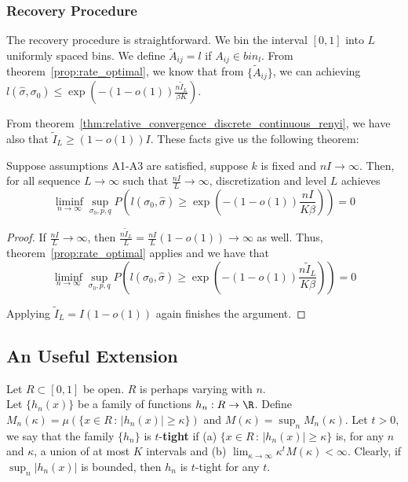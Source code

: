\documentclass{article}
\begin{document}
\subsubsection{Recovery Procedure}

The recovery procedure is straightforward. We bin the interval $[0,1]$ into $L$ uniformly spaced bins. We define $\tilde{A}_{ij} = l$ if $A_{ij} \in bin_l$. From theorem~\ref{prop:rate_optimal}, we know that from $\{\tilde{A}_{ij}\}$, we can achieving $l(\hat{\sigma}, \sigma_0) \leq \exp\left( - (1 - o(1)) \frac{n \tilde{I}_L}{\beta K } \right)$. 

From theorem~\ref{thm:relative_convergence_discrete_continuous_renyi}, we have also that $\tilde{I}_L \geq (1 - o(1)) I$. These facts give us the following theorem:

\begin{theorem}
\label{thm:continuous_optimal_recovery}
Suppose assumptions A1-A3 are satisfied, suppose $k$ is fixed and $n I \rightarrow \infty$. Then, for all sequence $L \rightarrow \infty$ such that $\frac{n I}{L} \rightarrow \infty$, discretization and level $L$ achieves
\[
\liminf_{n \rightarrow \infty} \sup_{\sigma_0, p, q} 
   P \left( l(\sigma_0, \hat{\sigma}) \geq 
              \exp \left( - (1-o(1)) \frac{n I}{K \beta} \right) \right)
   = 0
\]
\end{theorem}

\begin{proof}

If $\frac{nI}{L} \rightarrow \infty$, then $\frac{n \tilde{I}_L}{L} = \frac{n I}{L}(1 - o(1)) \rightarrow \infty$ as well. Thus, theorem~\ref{prop:rate_optimal} applies and we have that
\[
\liminf_{n \rightarrow \infty} \sup_{\sigma_0, p, q} 
   P \left( l(\sigma_0, \hat{\sigma}) \geq 
              \exp \left( - (1-o(1)) \frac{n \tilde{I}_L}{K \beta} \right) \right)
   = 0
\]

Applying $\tilde{I}_L = I(1-o(1))$ again finishes the argument.

\end{proof}


\subsection{An Useful Extension}

Let $R \subset [0,1]$ be open. $R$ is perhaps varying with $n$. \\

Let $\{h_n(x)\}$ be a family of functions $h_n : R \rightarrow \R$. Define $M_n(\kappa) = \mu\left( \{ x \in R \,:\, |h_n(x)| \geq \kappa\} \right)$ and $M(\kappa) = \sup_n M_n(\kappa)$. Let $t > 0$, we say that the family $\{h_n\}$ is $t$-\textbf{tight} if (a) $\{ x \in R \,:\, |h_n(x)| \geq \kappa\}$ is, for any $n$ and $\kappa$, a union of at most $K$ intervals and (b) $\lim_{\kappa \rightarrow \infty} \kappa^t M(\kappa) < \infty$. Clearly, if $\sup_n |h_n(x)|$ is bounded, then $h_n$ is $t$-tight for any $t$. 
\end{document}
